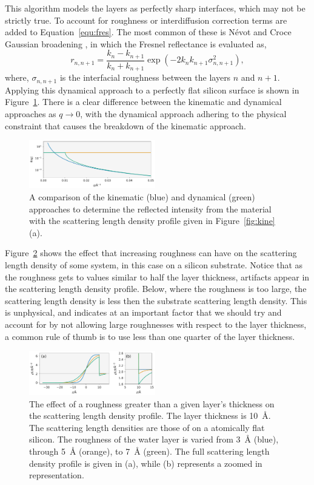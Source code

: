 \documentclass[
 reprint,
 superscriptaddress,
 amsmath,amssymb,
 aps,
]{revtex4-1}
\newcommand{\angstrom}{\rm{\AA}}
\begin{document}
This algorithm models the layers as perfectly sharp interfaces, which may not be strictly true.
To account for roughness or interdiffusion correction terms are added to Equation~\ref{equ:fres}.
The most common of these is N\'{e}vot and Croce Gaussian broadening \cite{nevot_caracterisation_1980}, in which the Fresnel reflectance is evaluated as,
%
\begin{equation}
    r_{n, n+1} = \frac{k_n - k_{n+1}}{k_n + k_{n+1}} \exp{(-2k_nk_{n+1}\sigma^2_{n,n+1})},
\end{equation}
%
where, $\sigma_{n, n+1}$ is the interfacial roughness between the layers $n$ and $n+1$.
Applying this dynamical approach to a perfectly flat silicon surface is shown in Figure~\ref{fig:dyna}.
There is a clear difference between the kinematic and dynamical approaches as $q \to 0$, with the dynamical approach adhering to the physical constraint that causes the breakdown of the kinematic approach.
%
\begin{figure}[t]
    \includegraphics[width=0.49\textwidth]{dyna}
    \caption{A comparison of the kinematic (blue) and dynamical (green) approaches to determine the reflected intensity from the material with the scattering length density profile given in Figure~\ref{fig:kine}(a).}
    \label{fig:dyna}
\end{figure}
%

Figure~\ref{fig:rough} shows the effect that increasing roughness can have on the scattering length density of some system, in this case  on a silicon substrate.
Notice that as the roughness gets to values similar to half the layer thickness, artifacts appear in the scattering length density profile.
Below, where the roughness is too large, the scattering length density is less then the substrate scattering length density.
This is unphysical, and indicates at an important factor that we should try and account for by not allowing large roughnesses with respect to the layer thickness, a common rule of thumb is to use less than one quarter of the layer thickness.
%
\begin{figure}[t]
    \includegraphics[width=0.49\textwidth]{roughness}
    \caption{The effect of a roughness greater than a given layer's thickness on the scattering length density profile. The layer thickness is \SI{10}{\angstrom}. The scattering length densities are those of  on a atomically flat silicon. The roughness of the water layer is varied from \SI{3}{\angstrom} (blue), through \SI{5}{\angstrom} (orange), to \SI{7}{\angstrom} (green). The full scattering length density profile is given in (a), while (b) represents a zoomed in representation.}
    \label{fig:rough}
\end{figure}
%
\end{document}
